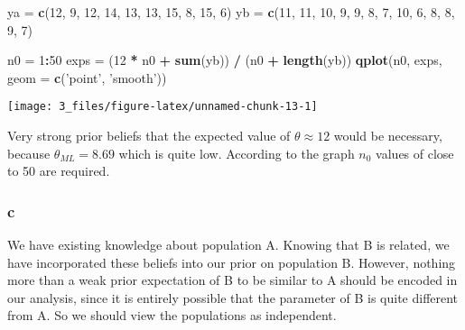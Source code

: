 \documentclass[]{article}
\newenvironment{Shaded}{\begin{snugshade}}{\end{snugshade}}
\newcommand{\DataTypeTok}[1]{\textcolor[rgb]{0.13,0.29,0.53}{#1}}
\newcommand{\DecValTok}[1]{\textcolor[rgb]{0.00,0.00,0.81}{#1}}
\newcommand{\KeywordTok}[1]{\textcolor[rgb]{0.13,0.29,0.53}{\textbf{#1}}}
\newcommand{\NormalTok}[1]{#1}
\newcommand{\OperatorTok}[1]{\textcolor[rgb]{0.81,0.36,0.00}{\textbf{#1}}}
\newcommand{\StringTok}[1]{\textcolor[rgb]{0.31,0.60,0.02}{#1}}
\begin{document}
\begin{Shaded}
\begin{Highlighting}[]
\NormalTok{ya =}\StringTok{ }\KeywordTok{c}\NormalTok{(}\DecValTok{12}\NormalTok{, }\DecValTok{9}\NormalTok{, }\DecValTok{12}\NormalTok{, }\DecValTok{14}\NormalTok{, }\DecValTok{13}\NormalTok{, }\DecValTok{13}\NormalTok{, }\DecValTok{15}\NormalTok{, }\DecValTok{8}\NormalTok{, }\DecValTok{15}\NormalTok{, }\DecValTok{6}\NormalTok{)}
\NormalTok{yb =}\StringTok{ }\KeywordTok{c}\NormalTok{(}\DecValTok{11}\NormalTok{, }\DecValTok{11}\NormalTok{, }\DecValTok{10}\NormalTok{, }\DecValTok{9}\NormalTok{, }\DecValTok{9}\NormalTok{, }\DecValTok{8}\NormalTok{, }\DecValTok{7}\NormalTok{, }\DecValTok{10}\NormalTok{, }\DecValTok{6}\NormalTok{, }\DecValTok{8}\NormalTok{, }\DecValTok{8}\NormalTok{, }\DecValTok{9}\NormalTok{, }\DecValTok{7}\NormalTok{)}

\NormalTok{n0 =}\StringTok{ }\DecValTok{1}\OperatorTok{:}\DecValTok{50}
\NormalTok{exps =}\StringTok{ }\NormalTok{(}\DecValTok{12} \OperatorTok{*}\StringTok{ }\NormalTok{n0 }\OperatorTok{+}\StringTok{ }\KeywordTok{sum}\NormalTok{(yb)) }\OperatorTok{/}\StringTok{ }\NormalTok{(n0 }\OperatorTok{+}\StringTok{ }\KeywordTok{length}\NormalTok{(yb))}
\KeywordTok{qplot}\NormalTok{(n0, exps, }\DataTypeTok{geom =} \KeywordTok{c}\NormalTok{(}\StringTok{'point'}\NormalTok{, }\StringTok{'smooth'}\NormalTok{))}
\end{Highlighting}
\end{Shaded}

\begin{center}\texttt{[image: 3\_files/figure-latex/unnamed-chunk-13-1]} \end{center}

Very strong prior beliefs that the expected value of
\(\theta \approx 12\) would be necessary, because \(\theta_{ML} = 8.69\)
which is quite low. According to the graph \(n_0\) values of close to 50
are required.

\hypertarget{c-1}{%
\subsubsection{c}\label{c-1}}

We have existing knowledge about population A. Knowing that B is
related, we have incorporated these beliefs into our prior on population
B. However, nothing more than a weak prior expectation of B to be
similar to A should be encoded in our analysis, since it is entirely
possible that the parameter of B is quite different from A. So we should
view the populations as independent.
\end{document}
